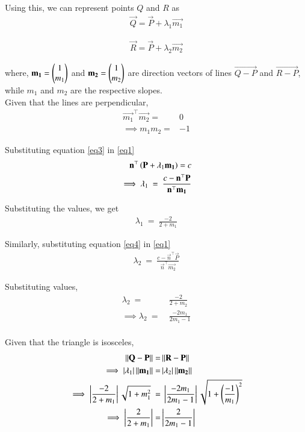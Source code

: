 \documentclass[journal]{IEEEtran}
\begin{document}
Using this, we can represent points $Q$ and $R$ as
\begin{align}
    \vec{Q} = \vec{P} + \lambda_1\vec{m_1}\label{eq3}
\end{align}

\begin{align}
    \vec{R} = \vec{P} + \lambda_2\vec{m_2} \label{eq4}
\end{align}

where, $\mathbf{m_1} = \begin{pmatrix}1\\m_1\end{pmatrix}$ and $\mathbf{m_2} = \begin{pmatrix}1\\m_2\end{pmatrix}$ are direction vectors of lines $\vec{Q-P}$ and $\vec{R-P}$, while $m_1$ and $m_2$ are the respective slopes.\\

Given that the lines are perpendicular, 
\begin{align}
    \vec{m_1}^\top\vec{m_2} =& 0\\
    \implies m_1m_2 =& -1
\end{align}

Substituting equation \eqref{eq3} in \eqref{eq1}
\begin{align}
    \vec{n}^\top\brak{\vec{P} + \lambda_1\vec{m_1}} = c\\
    \implies \lambda_1 \ = \ \frac{c-\vec{n}^\top\vec{P}}{\vec{n}^\top\vec{m_1}}
\end{align}

Substituting the values, we get
\begin{align}
    \lambda_1 \ = \ \frac{-2}{2+m_1}
\end{align}

Similarly, substituting equation \eqref{eq4} in \eqref{eq1}
\begin{align}
    \lambda_2 \ = \ \frac{c-\vec{n}^\top\vec{P}}{\vec{n}^\top\vec{m_2}}
\end{align}

Substituting values,
\begin{align}
    \lambda_2 \ =&\ \frac{-2}{2+m_2}\\
    \implies \lambda_2 \ =& \ \frac{-2m_1}{2m_1-1}
\end{align}\\

Given that the triangle is isosceles,
\begin{align}
  \norm{\vec{Q}-\vec{P}}=&\norm{\vec{R-P}}\\
  \implies \abs{\lambda_1}\norm{\vec{m_1}} =& \abs{\lambda_2}\norm{\vec{m_2}}\\
  \implies \abs{ \frac{-2}{2+m_1}}\sqrt{1+m_1^2} \ =&\  \abs{\frac{-2m_1}{2m_1-1}}\sqrt{1+\brak{\frac{-1}{m_1}}^2} \\
  \implies  \abs{ \frac{2}{2+m_1}} =& \abs{\frac{2}{2m_1-1}}
\end{align}\\
\end{document}
